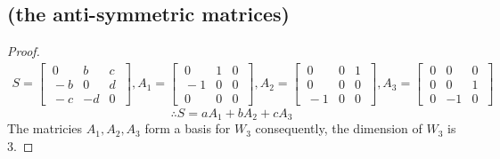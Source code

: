 \documentclass[../main.tex]{subfiles}
\begin{document}
\subsection{ (the anti-symmetric matrices)}
\begin{proof}
        \begin{align*}
                S = \begin{bmatrix}
                        \ 0  & b  & c \ \\
                        \ -b & 0  & d \ \\
                        \ -c & -d & 0 \
                \end{bmatrix},
                A_{1} = \begin{bmatrix}
                        \ 0  & 1 & 0 \ \\
                        \ -1 & 0 & 0 \ \\
                        \ 0  & 0 & 0 \
                \end{bmatrix},
                A_{2} = \begin{bmatrix}
                        \ 0  & 0 & 1 \ \\
                        \ 0  & 0 & 0 \ \\
                        \ -1 & 0 & 0 \
                \end{bmatrix},
                A_{3} = \begin{bmatrix}
                        \ 0 & 0  & 0 \ \\
                        \ 0 & 0  & 1 \ \\
                        \ 0 & -1 & 0 \
                \end{bmatrix}
        \end{align*}
        $$\therefore S= aA_{1}+bA_{2}+cA_{3}$$
        The matricies $A_{1},A_{2},A_{3}$ form a basis for $W_3$ consequently, the dimension of $W_3$ is $3$.
\end{proof}
\end{document}

